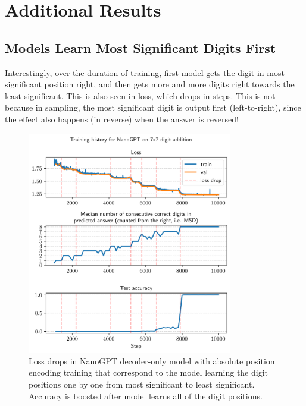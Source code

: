 \chapter{Additional Results}\label{app:additional_results}


\section{Models Learn Most Significant Digits First}
Interestingly, over the duration of training, first model gets the digit in most significant position right, and then gets more and more digits right towards the least significant. This is also seen in loss, which drops in steps. This is not because in sampling, the most significant digit is output first (left-to-right), since the effect also happens (in reverse) when the answer is reversed!

\begin{figure}[ht]
    \centering
    \includegraphics[width=0.8\textwidth]{fig/digitwise_loss.png}
    \caption{Loss drops in NanoGPT decoder-only model with absolute position encoding training that correspond to the model learning the digit positions one by one from most significant to least significant. Accuracy is boosted after model learns all of the digit positions.}
    \label{fig:digitwise_loss}
\end{figure}

